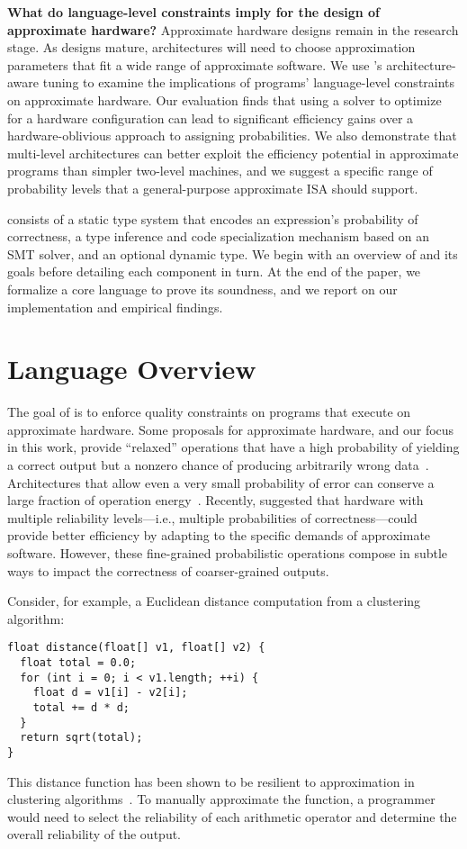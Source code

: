 {\textbf{What do language-level constraints imply for the design of approximate
hardware?}
Approximate hardware designs remain in the research stage.
As designs mature, architectures will need to choose approximation parameters
that fit a wide range of approximate software.
We use \lang's architecture-aware tuning to examine the implications of
programs' language-level constraints on approximate hardware.
Our evaluation finds that using a solver to optimize for a hardware
configuration can lead to significant efficiency gains over a
hardware-oblivious approach to assigning probabilities.
We also demonstrate that multi-level architectures can better exploit the efficiency
potential in approximate programs than simpler two-level machines, and we
suggest a specific range of probability levels that a
general-purpose approximate ISA should support.

\lang consists of a static type system that encodes an expression's
probability of correctness, a type inference and code specialization mechanism
based on an SMT solver, and an optional dynamic type.
We begin with an overview of \lang and its goals before detailing each
component in turn.
At the end of the paper, we formalize a core language to prove its soundness,
and we report on our implementation and empirical findings.


\section{Language Overview}
\label{sec:overview}

The goal of \lang is to enforce quality constraints on programs that execute
on approximate hardware.
Some proposals for approximate hardware, and our focus in this work, provide ``relaxed'' operations that
have a high probability of yielding a correct output but a nonzero chance of
producing arbitrarily wrong data~\cite{truffle}.
Architectures that allow even a very small probability of error can conserve a
large fraction of operation energy~\cite{kim-hpca, uva-adder}.
Recently, \citet{quora} suggested that hardware with multiple
reliability levels---i.e., multiple probabilities of correctness---could provide
better efficiency by adapting to the specific demands of approximate software.
However, these fine-grained probabilistic operations compose in subtle ways to
impact the correctness of coarser-grained outputs.

Consider, for example, a Euclidean distance computation from a clustering
algorithm:
%
\begin{lstlisting}
float distance(float[] v1, float[] v2) {
  float total = 0.0;
  for (int i = 0; i < v1.length; ++i) {
    float d = v1[i] - v2[i];
    total += d * d;
  }
  return sqrt(total);
}
\end{lstlisting}
%
This distance function has been shown to be resilient to approximation in
clustering algorithms~\cite{npu}.
To manually approximate the function, a programmer would need to select the
reliability of each arithmetic operator and determine the overall reliability
of the output.

}
